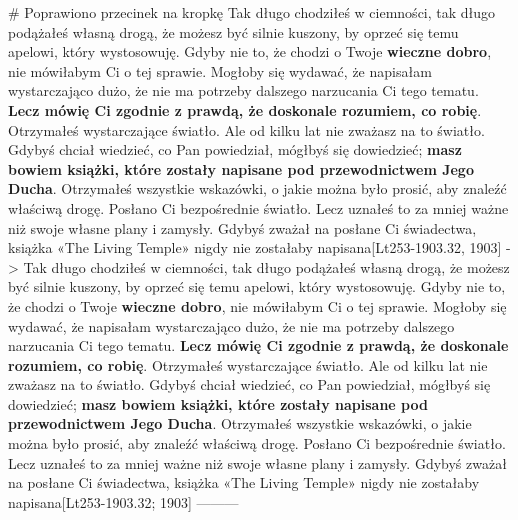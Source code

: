# Poprawiono przecinek na kropkę
{Tak długo chodziłeś w ciemności, tak długo podążałeś własną drogą, że możesz być silnie kuszony, by oprzeć się temu apelowi, który wystosowuję. Gdyby nie to, że chodzi o Twoje \textbf{wieczne dobro}, nie mówiłabym Ci o tej sprawie. Mogłoby się wydawać, że napisałam wystarczająco dużo, że nie ma potrzeby dalszego narzucania Ci tego tematu. \textbf{Lecz mówię Ci zgodnie z prawdą, że doskonale rozumiem, co robię}. Otrzymałeś wystarczające światło. Ale od kilku lat nie zważasz na to światło. Gdybyś chciał wiedzieć, co Pan powiedział, mógłbyś się dowiedzieć; \textbf{masz bowiem książki, które zostały napisane pod przewodnictwem Jego Ducha}. Otrzymałeś wszystkie wskazówki, o jakie można było prosić, aby znaleźć właściwą drogę. Posłano Ci bezpośrednie światło. Lecz uznałeś to za mniej ważne niż swoje własne plany i zamysły. Gdybyś zważał na posłane Ci świadectwa, książka «The Living Temple» nigdy nie zostałaby napisana}[Lt253-1903.32, 1903]
->
{Tak długo chodziłeś w ciemności, tak długo podążałeś własną drogą, że możesz być silnie kuszony, by oprzeć się temu apelowi, który wystosowuję. Gdyby nie to, że chodzi o Twoje \textbf{wieczne dobro}, nie mówiłabym Ci o tej sprawie. Mogłoby się wydawać, że napisałam wystarczająco dużo, że nie ma potrzeby dalszego narzucania Ci tego tematu. \textbf{Lecz mówię Ci zgodnie z prawdą, że doskonale rozumiem, co robię}. Otrzymałeś wystarczające światło. Ale od kilku lat nie zważasz na to światło. Gdybyś chciał wiedzieć, co Pan powiedział, mógłbyś się dowiedzieć; \textbf{masz bowiem książki, które zostały napisane pod przewodnictwem Jego Ducha}. Otrzymałeś wszystkie wskazówki, o jakie można było prosić, aby znaleźć właściwą drogę. Posłano Ci bezpośrednie światło. Lecz uznałeś to za mniej ważne niż swoje własne plany i zamysły. Gdybyś zważał na posłane Ci świadectwa, książka «The Living Temple» nigdy nie zostałaby napisana}[Lt253-1903.32; 1903]
---------